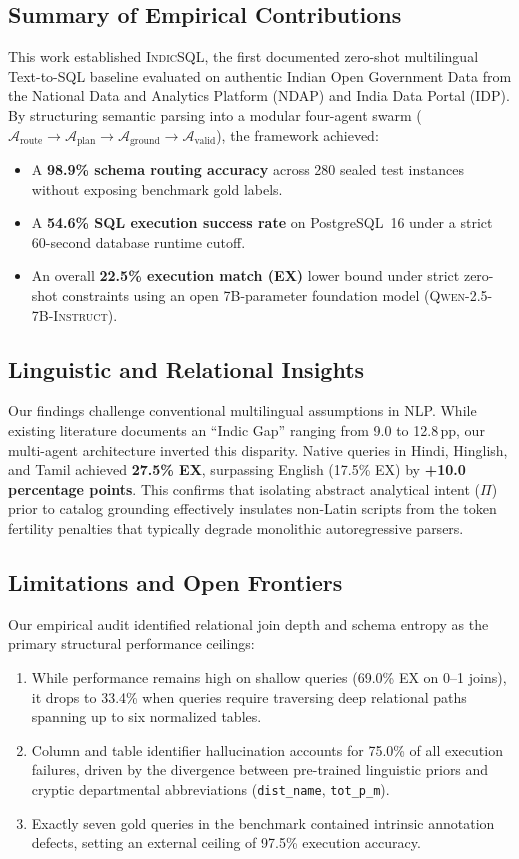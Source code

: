 \documentclass[conference]{IEEEtran}
\begin{document}
\subsection{Summary of Empirical Contributions}
This work established \textsc{IndicSQL}, the first documented zero-shot multilingual Text-to-SQL baseline evaluated on authentic Indian Open Government Data from the National Data and Analytics Platform (NDAP) and India Data Portal (IDP). By structuring semantic parsing into a modular four-agent swarm ($\mathcal{A}_{\text{route}} \rightarrow \mathcal{A}_{\text{plan}} \rightarrow \mathcal{A}_{\text{ground}} \rightarrow \mathcal{A}_{\text{valid}}$), the framework achieved:
\begin{itemize}
    \item A \textbf{98.9\% schema routing accuracy} across 280 sealed test instances without exposing benchmark gold labels.
    \item A \textbf{54.6\% SQL execution success rate} on PostgreSQL~16 under a strict 60-second database runtime cutoff.
    \item An overall \textbf{22.5\% execution match (EX)} lower bound under strict zero-shot constraints using an open 7B-parameter foundation model (\textsc{Qwen-2.5-7B-Instruct}).
\end{itemize}

\subsection{Linguistic and Relational Insights}
Our findings challenge conventional multilingual assumptions in NLP. While existing literature documents an ``Indic Gap'' ranging from 9.0 to 12.8\,pp, our multi-agent architecture inverted this disparity. Native queries in Hindi, Hinglish, and Tamil achieved \textbf{27.5\% EX}, surpassing English (17.5\% EX) by \textbf{+10.0 percentage points}. This confirms that isolating abstract analytical intent ($\Pi$) prior to catalog grounding effectively insulates non-Latin scripts from the token fertility penalties that typically degrade monolithic autoregressive parsers.

\subsection{Limitations and Open Frontiers}
Our empirical audit identified relational join depth and schema entropy as the primary structural performance ceilings:
\begin{enumerate}
    \item While performance remains high on shallow queries (69.0\% EX on 0--1 joins), it drops to 33.4\% when queries require traversing deep relational paths spanning up to six normalized tables.
    \item Column and table identifier hallucination accounts for 75.0\% of all execution failures, driven by the divergence between pre-trained linguistic priors and cryptic departmental abbreviations (\texttt{dist\_name}, \texttt{tot\_p\_m}).
    \item Exactly seven gold queries in the benchmark contained intrinsic annotation defects, setting an external ceiling of 97.5\% execution accuracy.
\end{enumerate}
\end{document}
